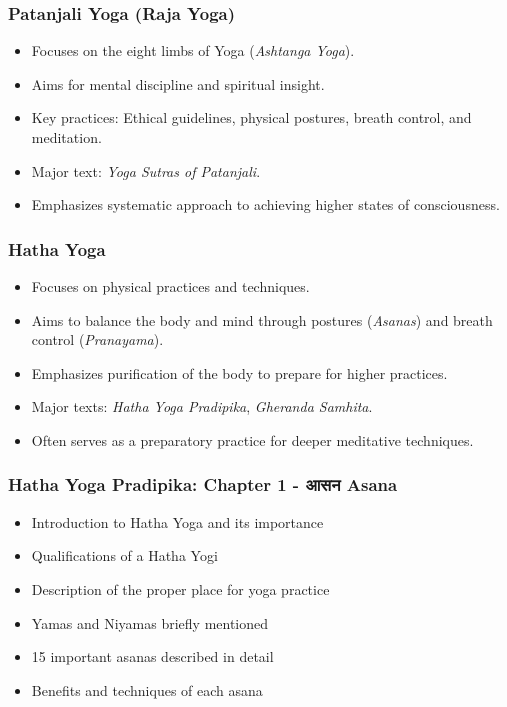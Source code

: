 \begin{frame}[fragile]\frametitle{Patanjali Yoga (Raja Yoga)}

      \begin{itemize}
		\item Focuses on the eight limbs of Yoga (\textit{Ashtanga Yoga}).
		\item Aims for mental discipline and spiritual insight.
		\item Key practices: Ethical guidelines, physical postures, breath control, and meditation.
		\item Major text: \textit{Yoga Sutras of Patanjali}.
		\item Emphasizes systematic approach to achieving higher states of consciousness.
	  \end{itemize}

\end{frame}

\begin{frame}[fragile]\frametitle{Hatha Yoga}

      \begin{itemize}
		\item Focuses on physical practices and techniques.
		\item Aims to balance the body and mind through postures (\textit{Asanas}) and breath control (\textit{Pranayama}).
		\item Emphasizes purification of the body to prepare for higher practices.
		\item Major texts: \textit{Hatha Yoga Pradipika}, \textit{Gheranda Samhita}.
		\item Often serves as a preparatory practice for deeper meditative techniques.
	  \end{itemize}

\end{frame}


\begin{frame}[fragile]\frametitle{Hatha Yoga Pradipika: Chapter 1 - आसन  Asana}
\begin{itemize}
    \item Introduction to Hatha Yoga and its importance
    \item Qualifications of a Hatha Yogi
    \item Description of the proper place for yoga practice
    \item Yamas and Niyamas briefly mentioned
    \item 15 important asanas described in detail
    \item Benefits and techniques of each asana
\end{itemize}
\end{frame}

